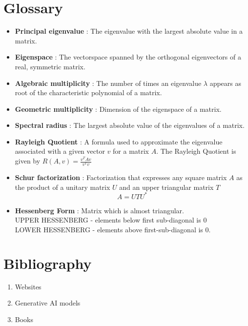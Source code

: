 \documentclass[report,12pt,onecolumn]{IEEEtran}
\theoremstyle{remark}
\begin{document}
		\section{\Large Glossary}
		\begin{itemize}
			\item \textbf{Principal eigenvalue} : The eigenvalue with the largest absolute value in a matrix.
			\item \textbf{Eigenspace} : The vectorspace spanned by the orthogonal eigenvectors of a real, symmetric matrix.
			\item \textbf{Algebraic multiplicity} : The number of times an eigenvalue $\lambda$ appears as root of the characteristic polynomial of a matrix.
			\item \textbf{Geometric multiplicity} : Dimension of the eigenspace of a matrix.
			\item \textbf{Spectral radius} : The largest absolute value of the eigenvalues of a matrix.
			\item \textbf{Rayleigh Quotient} : A formula used to approximate the eigenvalue associated with a given vector $v$ for a matrix $A$. The Rayleigh Quotient is given by $R(A,v) = \frac{v^TAv}{v^Tv}$
			\item \textbf{Schur factorization} : Factorization that expresses any square matrix $A$ as the product of a unitary matrix $U$ and an upper triangular matrix $T$
				$$ A = UTU^{*} $$
			\item \textbf{Hessenberg Form} : Matrix which is almost triangular. \\
				UPPER HESSENBERG - elements below first sub-diagonal is 0 \\
				LOWER HESSENBERG - elements above first-sub-diagonal is 0. 
				
		
			
		\end{itemize}
	\section{\Large Bibliography} 
		\begin{enumerate}
			\item Websites
			\item Generative AI models
			\item Books
		\end{enumerate}
\end{document}
